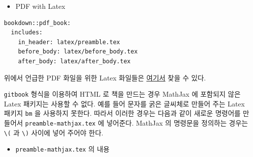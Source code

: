 \documentclass[
]{book}
\providecommand{\tightlist}{%
  \setlength{\itemsep}{0pt}\setlength{\parskip}{0pt}}
\theoremstyle{definition}
\theoremstyle{definition}
\theoremstyle{definition}
\theoremstyle{definition}
\theoremstyle{remark}
\begin{document}
\begin{itemize}
\tightlist
\item
  PDF with Latex
\end{itemize}

\begin{verbatim}
bookdown::pdf_book:
  includes:
    in_header: latex/preamble.tex
    before_body: latex/before_body.tex
    after_body: latex/after_body.tex
\end{verbatim}

위에서 언급한 PDF 화일을 위한 Latex 화일들은 \href{https://github.com/rstudio/bookdown/tree/master/inst/examples/latex}{여기서} 찾을 수 있다.

\texttt{gitbook} 형식을 이용하여 HTML 로 책을 만드는 경우 MathJax 에 포함되지 않은 Latex 패키지는 사용할 수 없다. 예를 들어 문자를 굵은 글씨체로 만들어 주는 Latex 패키지 \texttt{bm} 을 사용하지 못한다. 따라서 이러한 경우는 다음과 같이 새로운 명령어를 만들어서 \texttt{preamble-mathjax.tex} 에 넣어준다. MathJax 의 명령문을 정의하는 경우는 \texttt{\textbackslash{}(} 과 \texttt{\textbackslash{})} 사이에 넣어 주어야 한다.

\begin{itemize}
\tightlist
\item
  \texttt{preamble-mathjax.tex} 의 내용
\end{itemize}
\end{document}
